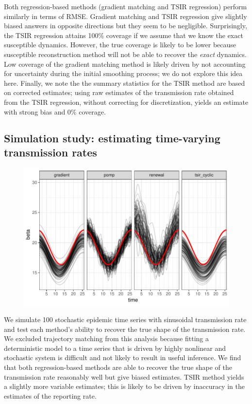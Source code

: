 \documentclass{article}
\begin{document}
Both regression-based methods (gradient matching and TSIR regression) perform similarly in terms of RMSE.
Gradient matching and TSIR regression give slightly biased answers in opposite directions but they seem to be negligible.
Surprisingly, the TSIR regression attains 100\% coverage if we assume that we know the exact susceptible dynamics.
However, the true coverage is likely to be lower because susceptible reconstruction method will not be able to recover the \textit{exact} dynamics.
Low coverage of the gradient matching method is likely driven by not accounting for uncertainty during the initial smoothing process; we do not explore this idea here.
Finally, we note the the summary statistics for the TSIR method are based on corrected estimates; using raw estimates of the transmission rate obtained from the TSIR regression, without correcting for discretization, yields an estimate with strong bias and 0\% coverage.

\subsection{Simulation study: estimating time-varying transmission rates}

\begin{figure}[!t]
\includegraphics[width=\textwidth]{../figure/compare_transmission.pdf}
\end{figure}

We simulate 100 stochastic epidemic time series with sinusoidal transmission rate and test each method's ability to recover the true shape of the transmission rate.
We excluded trajectory matching from this analysis because fitting a deterministic model to a time series that is driven by highly nonlinear and stochastic system is difficult and not likely to result in useful inference. 
We find that both regression-based methods are able to recover the true shape of the transmission rate reasonably well but give biased estimates.
TSIR method yields a slightly more variable estimates; this is likely to be driven by inaccuracy in the estimates of the reporting rate. 
\end{document}
